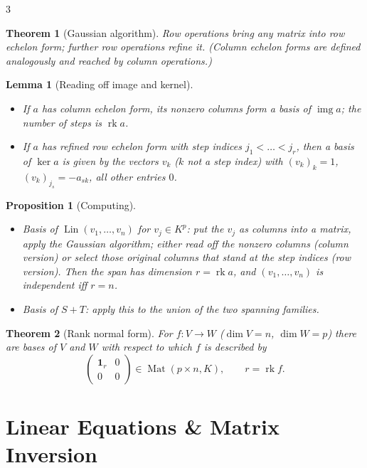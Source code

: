 \documentclass[10pt,a4paper,landscape]{article}
\theoremstyle{definition}
\theoremstyle{plain}
\newtheorem{thm}{Theorem}[section]
\newtheorem{lem}{Lemma}[section]
\newtheorem{prop}{Proposition}[section]
\theoremstyle{remark}
\DeclareMathOperator{\Lin}{Lin}
\DeclareMathOperator{\Mat}{Mat}
\DeclareMathOperator{\rk}{rk}
\DeclareMathOperator{\img}{img}
\newcommand{\one}{\mathbf{1}}
\begin{document}
\begin{multicols*}{3}
\begin{thm}[Gaussian algorithm]
Row operations bring any matrix into row echelon form; further row operations refine it. (Column echelon forms are defined analogously and reached by column operations.)
\end{thm}

\begin{lem}[Reading off image and kernel]
\begin{itemize}
\item If $a$ has \emph{column} echelon form, its nonzero columns form a basis of $\img a$; the number of steps is $\rk a$.
\item If $a$ has \emph{refined row} echelon form with step indices $j_1 < \dots < j_r$, then a basis of $\ker a$ is given by the vectors $v_k$ ($k$ not a step index) with $(v_k)_k = 1$, $(v_k)_{j_s} = -a_{s k}$, all other entries $0$.
\end{itemize}
\end{lem}

\begin{prop}[Computing]
\begin{itemize}
\item Basis of $\Lin(v_1, \dots, v_n)$ for $v_j \in K^p$: put the $v_j$ as columns into a matrix, apply the Gaussian algorithm; either read off the nonzero columns (column version) or select those original columns that stand at the step indices (row version). Then the span has dimension $r = \rk a$, and $(v_1, \dots, v_n)$ is independent iff $r = n$.
\item Basis of $S + T$: apply this to the union of the two spanning families.
\end{itemize}
\end{prop}

\begin{thm}[Rank normal form]
For $f: V \to W$ ($\dim V = n$, $\dim W = p$) there are bases of $V$ and $W$ with respect to which $f$ is described by
\[
\begin{pmatrix} \one_r & 0 \\ 0 & 0 \end{pmatrix} \in \Mat(p \times n, K), \qquad r = \rk f.
\]
\end{thm}

\section{Linear Equations \& Matrix Inversion}


\end{multicols*}
\end{document}
